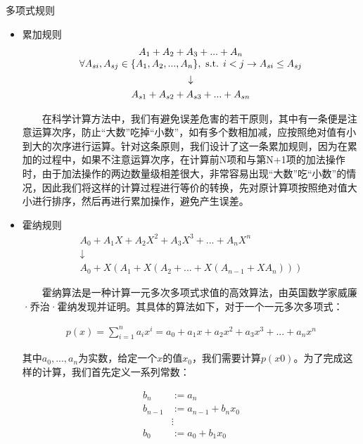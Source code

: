 \vspace{1mm}
\begin{center}
{\kaishu{} 多项式规则}
\end{center}
\vspace{1mm}

\begin{itemize}
  \item {\kaishu 累加规则} 
  \begin{gather*}
  \begin{array}{@{}c@{}} A_1 + A_2 + A_3 + ... + A_n \\ \forall A_{si}, A_{sj} \in \{A_1, A_2, ... , A_n\}, \text{ s.t. } i<j \rightarrow     A_{si}\leq A_{sj} \end{array} \\
  \downarrow \\
  A_{s1} + A_{s2} + A_{s3} + ... + A_{sn}
  \end{gather*}

  　　在科学计算方法中，我们有避免误差危害的若干原则，其中有一条便是注意运算次序，防止“大数”吃掉“小数”，如有多个数相加减，应按照绝对值有小到大的次序进行运算。针对这条原则，我们设计了这一条累加规则，因为在累加的过程中，如果不注意运算次序，在计算前N项和与第N+1项的加法操作时，由于加法操作的两边数量级相差很大，非常容易出现“大数”吃“小数”的情况，因此我们将这样的计算过程进行等价的转换，先对原计算项按照绝对值大小进行排序，然后再进行累加操作，避免产生误差。\\

  \item {\kaishu 霍纳规则} 
  \begin{gather*}
  A_0 + A_1X + A_2X^2 + A_3X^3 + ... + A_nX^n \\
  \downarrow \\
  A_0 + X(A_1 + X(A_2 + ... + X(A_{n-1} + XA_n)))
  \end{gather*}

  　　霍纳算法是一种计算一元多次多项式求值的高效算法，由英国数学家威廉·乔治·霍纳发现并证明。其具体的算法如下，对于一个一元多次多项式：

  \begin{gather*}
    p(x) = \sum_{i=1}^{n} a_ix^i = a_0+a_1x+a_2x^2+a_3x^3+...+a_nx^n
  \end{gather*}

  其中$a_0,...,a_n$为实数，给定一个$x$的值$x_0$，我们需要计算$p(x0)$。为了完成这样的计算，我们首先定义一系列常数：

  \begin{equation*}
    \begin{split}
    b_n & := a_n \\
    b_{n-1} & := a_{n-1} + b_nx_0 \\
    & \vdots  \\
    b_0 & := a_0 + b_1x_0
    \end{split}
  \end{equation*}


\end{itemize}
